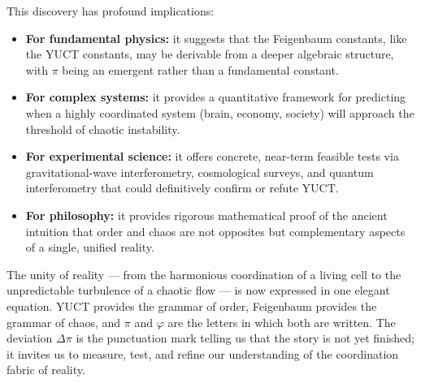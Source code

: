 \documentclass[11pt,a4paper]{article}
\begin{document}
	This discovery has profound implications:
	\begin{itemize}
		\item \textbf{For fundamental physics:} it suggests that the Feigenbaum constants, like the YUCT constants, may be derivable from a deeper algebraic structure, with \(\pi\) being an emergent rather than a fundamental constant.
		\item \textbf{For complex systems:} it provides a quantitative framework for predicting when a highly coordinated system (brain, economy, society) will approach the threshold of chaotic instability.
		\item \textbf{For experimental science:} it offers concrete, near-term feasible tests via gravitational-wave interferometry, cosmological surveys, and quantum interferometry that could definitively confirm or refute YUCT.
		\item \textbf{For philosophy:} it provides rigorous mathematical proof of the ancient intuition that order and chaos are not opposites but complementary aspects of a single, unified reality.
	\end{itemize}
	
	The unity of reality — from the harmonious coordination of a living cell to the unpredictable turbulence of a chaotic flow — is now expressed in one elegant equation. YUCT provides the grammar of order, Feigenbaum provides the grammar of chaos, and \(\pi\) and \(\varphi\) are the letters in which both are written. The deviation \(\Delta\pi\) is the punctuation mark telling us that the story is not yet finished; it invites us to measure, test, and refine our understanding of the coordination fabric of reality.
	
\end{document}

